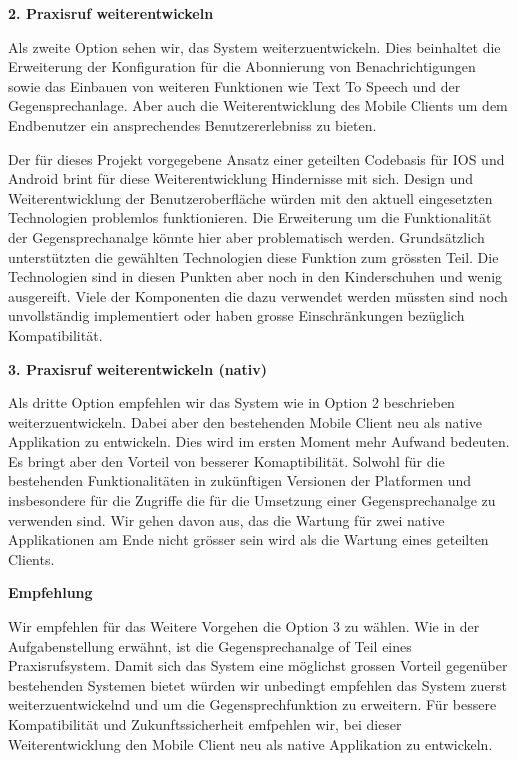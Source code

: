 \textbf{2. Praxisruf weiterentwickeln}

Als zweite Option sehen wir, das System weiterzuentwickeln.
Dies beinhaltet die Erweiterung der Konfiguration für die Abonnierung von Benachrichtigungen
sowie das Einbauen von weiteren Funktionen wie Text To Speech und der Gegensprechanlage.
Aber auch die Weiterentwicklung des Mobile Clients um dem Endbenutzer ein ansprechendes Benutzererlebniss zu bieten.

Der für dieses Projekt vorgegebene Ansatz einer geteilten Codebasis für IOS und Android brint für diese Weiterentwicklung Hindernisse mit sich.
Design und Weiterentwicklung der Benutzeroberfläche würden mit den aktuell eingesetzten Technologien problemlos funktionieren.
Die Erweiterung um die Funktionalität der Gegensprechanalge könnte hier aber problematisch werden.
Grundsätzlich unterstützten die gewählten Technologien diese Funktion zum grössten Teil.
Die Technologien sind in diesen Punkten aber noch in den Kinderschuhen und wenig ausgereift.
Viele der Komponenten die dazu verwendet werden müssten sind noch unvollständig implementiert oder haben grosse Einschränkungen bezüglich Kompatibilität.

\clearpage
\textbf{3. Praxisruf weiterentwickeln (nativ) }

Als dritte Option empfehlen wir das System wie in Option 2 beschrieben weiterzuentwickeln.
Dabei aber den bestehenden Mobile Client neu als native Applikation zu entwickeln.
Dies wird im ersten Moment mehr Aufwand bedeuten.
Es bringt aber den Vorteil von besserer Komaptibilität.
Solwohl für die bestehenden Funktionalitäten in zukünftigen Versionen der Platformen und insbesondere für die Zugriffe die für die Umsetzung einer Gegensprechanalge zu verwenden sind.
Wir gehen davon aus, das die Wartung für zwei native Applikationen am Ende nicht grösser sein wird als die Wartung eines geteilten Clients.

\textbf{Empfehlung}

Wir empfehlen für das Weitere Vorgehen die Option 3 zu wählen.
Wie in der Aufgabenstellung erwähnt, ist die Gegensprechanalge of Teil eines Praxisrufsystem.
Damit sich das System eine möglichst grossen Vorteil gegenüber bestehenden Systemen bietet würden wir unbedingt empfehlen das System zuerst weiterzuentwickelnd und um die Gegensprechfunktion zu erweitern.
Für bessere Kompatibilität und Zukunftssicherheit emfpehlen wir, bei dieser Weiterentwicklung den Mobile Client neu als native Applikation zu entwickeln.

\clearpage
